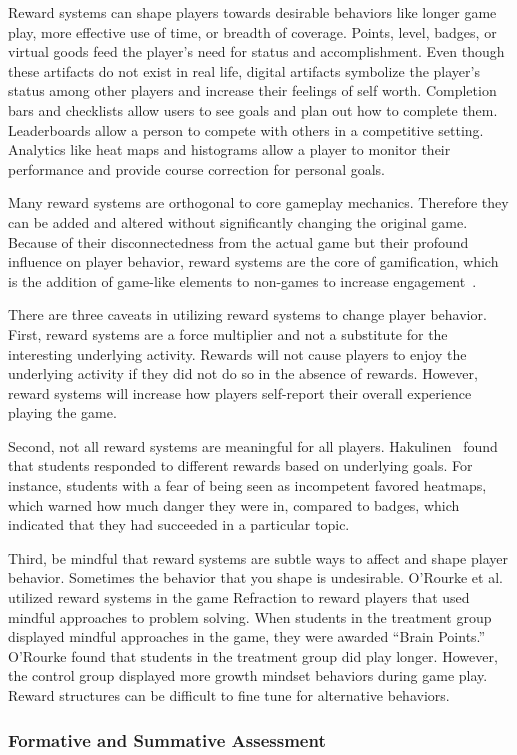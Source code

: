 \documentclass{sig-alternate-05-2015}
\begin{document}
Reward systems can shape players towards desirable behaviors like longer game play, more effective use of time, or breadth of coverage. Points, level, badges, or virtual goods feed the player's need for status and accomplishment. Even though these artifacts do not exist in real life, digital artifacts symbolize the player's status among other players and increase their feelings of self worth. Completion bars and checklists allow users to see goals and plan out how to complete them. Leaderboards allow a person to compete with others in a competitive setting. Analytics like heat maps and histograms allow a player to monitor their performance and provide course correction for personal goals.



Many reward systems are orthogonal to core gameplay mechanics. Therefore they can be added and altered without significantly changing the original game. Because of their disconnectedness from the actual game but their profound influence on player behavior, reward systems are the core of gamification, which is the addition of game-like elements to non-games to increase engagement~\cite{muntean11raising}.



There are three caveats in utilizing reward systems to change player behavior. First, reward systems are a force multiplier and not a substitute for the interesting underlying activity. Rewards will not cause players to enjoy the underlying activity if they did not do so in the absence of rewards. However, reward systems will increase how players self-report their overall experience playing the game.



Second, not all reward systems are meaningful for all players. Hakulinen~\cite{hakulinen2015gameful} found that students responded to different rewards based on underlying goals. For instance, students with a fear of being seen as incompetent favored heatmaps, which warned how much danger they were in, compared to badges, which indicated that they had succeeded in a particular topic.



Third, be mindful that reward systems are subtle ways to affect and shape player behavior. Sometimes the behavior that you shape is undesirable. O'Rourke et al.~\cite{o2016brain} utilized reward systems in the game Refraction to reward players that used mindful approaches to problem solving. When students in the treatment group displayed mindful approaches in the game, they were awarded ``Brain Points.'' O'Rourke found that students in the treatment group did play longer. However, the control group displayed more growth mindset behaviors during game play. Reward structures can be difficult to fine tune for alternative behaviors.\subsubsection{Formative and Summative Assessment}
\end{document}
